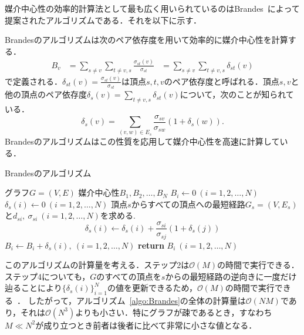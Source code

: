 媒介中心性の効率的計算法として最も広く用いられているのはBrandes~\cite{Brandes2001}によって提案されたアルゴリズムである．それを以下に示す．

Brandesのアルゴリズムは次のペア依存度を用いて効率的に媒介中心性を計算する．
\begin{equation*}
  \begin{aligned}
    B_v&=\sum_{s\neq v}\sum_{t\neq v,s}\frac{\sigma_{st}(v)}{\sigma_{st}}
    &=\sum_{s\neq v}\sum_{t\neq v,s}\delta_{st}(v)
  \end{aligned}
\end{equation*}
で定義される．$\delta_{st}(v)=\frac{\sigma_{st}(v)}{\sigma_{st}}$は頂点$s,t,v$のペア依存度と呼ばれる．頂点$s,v$と他の頂点のペア依存度$\delta_{s}(v)=\sum_{t\neq v,s}\delta_{st}(v)$について，次のことが知られている．
\begin{equation*}
  \delta_{s}(v)=\sum_{(v,w)\in E_s}\frac{\sigma_{sv}}{\sigma_{sw}}(1+\delta_{s}(w)).
\end{equation*}
Brandesのアルゴリズムはこの性質を応用して媒介中心性を高速に計算している．

\begin{algorithm}
  \caption{Brandesのアルゴリズム}
  \label{algo:Brandes}
  \begin{algorithmic}[1]
    \Require グラフ$G=(V,E)$
    \Ensure 媒介中心性$B_1,B_2,\ldots,B_N$
    \State $B_i\gets0\ (i=1,2,\ldots,N)$
    \State $\delta_s(i)\gets0\ (i=1,2,\ldots,N)$
    \State 頂点$s$からすべての頂点への最短経路$G_s=(V,E_s)$と$d_{si},\ \sigma_{si}\ (i=1,2,\ldots,N)$を求める. 
    \State \begin{equation*} \delta_s(i)\gets\delta_s(i)+\frac{\sigma_{si}}{\sigma_{sj}}(1+\delta_s(j)) \end{equation*}
    \EndFor
    \State $B_i\gets B_i+\delta_s(i),\ (i=1,2,\ldots,N)$
    \EndFor
    \State \textbf{return} $B_i\ (i=1,2,\ldots,N)$
  \end{algorithmic}
\end{algorithm}

このアルゴリズムの計算量を考える．ステップ2は$\mathcal{O}(M)$の時間で実行できる．
ステップ4についても，$G$のすべての頂点を$s$からの最短経路の逆向きに一度だけ辿ることにより$\{\delta_s(i)\}_{i=1}^N$の値を更新できるため，$\mathcal{O}(M)$の時間で実行できる~\cite{Brandes2001}．
したがって，アルゴリズム~\ref{algo:Brandes}の全体の計算量は$\mathcal{O}(NM)$であり，それは$\mathcal{O}(N^3)$よりも小さい．特にグラフが疎であるとき，すなわち$M \ll N^2$が成り立つとき前者は後者に比べて非常に小さな値となる．


